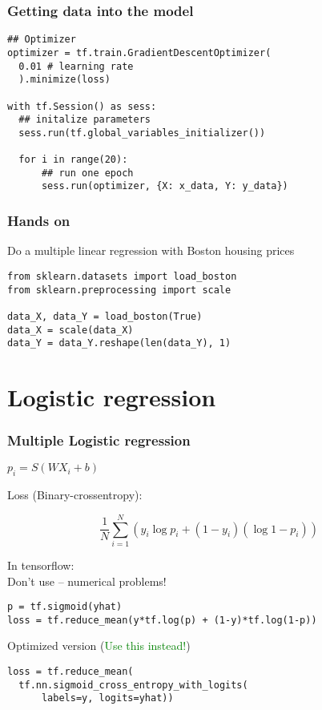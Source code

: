 \documentclass{beamer}
\begin{document}
\begin{frame}[fragile]
\frametitle{Getting data into the model}

\begin{lstlisting}
## Optimizer
optimizer = tf.train.GradientDescentOptimizer(
  0.01 # learning rate
  ).minimize(loss)

with tf.Session() as sess:
  ## initalize parameters
  sess.run(tf.global_variables_initializer())

  for i in range(20):
      ## run one epoch
      sess.run(optimizer, {X: x_data, Y: y_data})
\end{lstlisting}
\end{frame}

\begin{frame}[fragile]
\frametitle{Hands on}

Do a multiple linear regression with Boston housing prices

\begin{lstlisting}
from sklearn.datasets import load_boston
from sklearn.preprocessing import scale

data_X, data_Y = load_boston(True)
data_X = scale(data_X)
data_Y = data_Y.reshape(len(data_Y), 1)
\end{lstlisting}
\end{frame}

\section{Logistic regression}

\begin{frame}[fragile]
\frametitle{Multiple Logistic regression}

$p_i = S(WX_i + b)$

Loss (Binary-crossentropy):

\[\frac{1}{N}\sum_{i=1}^N (y_i\log{p_i} + (1-y_i)(\log{1-p_i}))\]

In tensorflow:\\
\footnotesize{\textcolor{reduhh}{Don't use -- numerical problems!}}

\begin{lstlisting}
p = tf.sigmoid(yhat)
loss = tf.reduce_mean(y*tf.log(p) + (1-y)*tf.log(1-p))
\end{lstlisting}

\pause

Optimized version (\footnotesize{\textcolor{green}{Use this instead!}})
\begin{lstlisting}
loss = tf.reduce_mean(
  tf.nn.sigmoid_cross_entropy_with_logits(
      labels=y, logits=yhat))
\end{lstlisting}

\end{frame}
\end{document}
